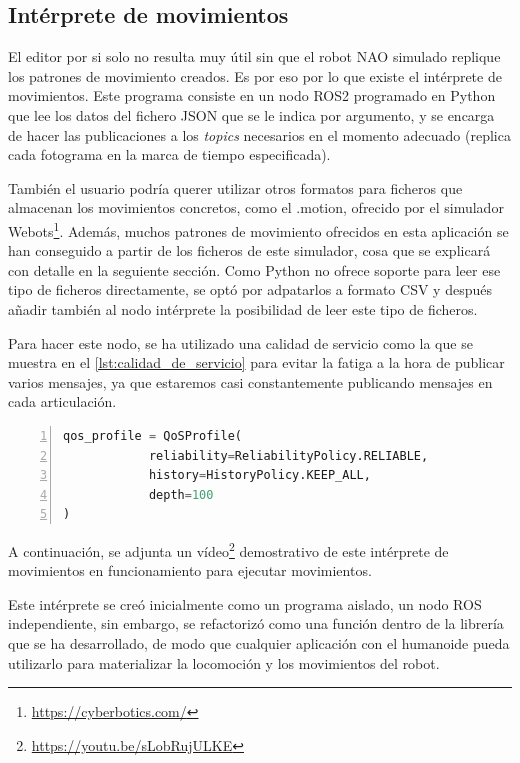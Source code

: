 \subsection{Intérprete de movimientos} \label{subsec:interprete}

El editor por si solo no resulta muy útil sin que el robot NAO simulado replique los patrones de movimiento creados. Es por eso por lo que existe el intérprete de movimientos. Este programa consiste en un nodo ROS2 programado en Python que lee los datos del fichero JSON que se le indica por argumento, y se encarga de hacer las publicaciones a los \textit{topics} necesarios en el momento adecuado (replica cada fotograma en la marca de tiempo especificada).

También el usuario podría querer utilizar otros formatos para ficheros que almacenan los movimientos concretos, como el .motion, ofrecido por el simulador Webots\footnote{\url{https://cyberbotics.com/}}. Además, muchos patrones de movimiento ofrecidos en esta aplicación se han conseguido a partir de los ficheros de este simulador, cosa que se explicará con detalle en la seguiente sección. Como Python no ofrece soporte para leer ese tipo de ficheros directamente, se optó por adpatarlos a formato CSV y después añadir también al nodo intérprete la posibilidad de leer este tipo de ficheros.

Para hacer este nodo, se ha utilizado una calidad de servicio como la que se muestra en el \autoref{lst:calidad_de_servicio} para evitar la fatiga a la hora de publicar varios mensajes, ya que estaremos casi constantemente publicando mensajes en cada articulación.

\begin{lstlisting}[language=Python, caption={Calidad de servicio utilizada para publicación de mensajes}, label={lst:calidad_de_servicio}, numbers=left, backgroundcolor=\color{gray!10}]    
qos_profile = QoSProfile(
            reliability=ReliabilityPolicy.RELIABLE,
            history=HistoryPolicy.KEEP_ALL,
            depth=100
)
\end{lstlisting}
 
A continuación, se adjunta un vídeo\footnote{\url{https://youtu.be/sLobRujULKE}} demostrativo de este intérprete de movimientos en funcionamiento para ejecutar movimientos.

Este intérprete se creó inicialmente como un programa aislado, un nodo ROS independiente, sin embargo, se refactorizó  como una función dentro de la librería que se ha desarrollado, de modo que cualquier aplicación con el humanoide pueda utilizarlo para materializar la locomoción y los movimientos del robot. 

